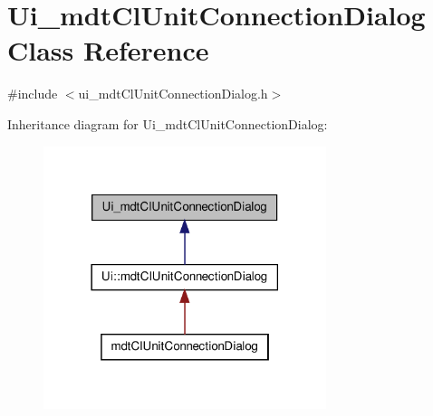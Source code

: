 \hypertarget{class_ui__mdt_cl_unit_connection_dialog}{\section{Ui\-\_\-mdt\-Cl\-Unit\-Connection\-Dialog Class Reference}
\label{class_ui__mdt_cl_unit_connection_dialog}
}


{\ttfamily \#include $<$ui\-\_\-mdt\-Cl\-Unit\-Connection\-Dialog.\-h$>$}



Inheritance diagram for Ui\-\_\-mdt\-Cl\-Unit\-Connection\-Dialog\-:
\nopagebreak
\begin{figure}[H]
\begin{center}
\leavevmode
\includegraphics[width=234pt]{class_ui__mdt_cl_unit_connection_dialog__inherit__graph}
\end{center}
\end{figure}


